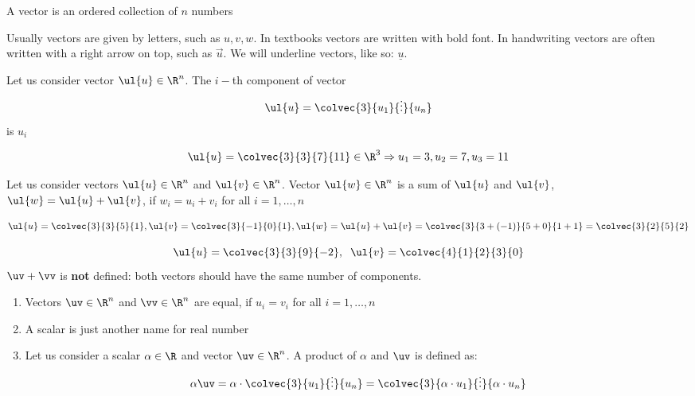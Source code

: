 \begin{definition}
	A vector is an ordered collection of $n$ numbers
\end{definition}

\begin{notation}
Usually vectors are given by letters, such as $u,v,w$. In textbooks vectors are written with bold font. In handwriting vectors are often written with a right arrow on top, such as $\overrightarrow{u}$. We will underline vectors, like so: $\underline{u}$.
\end{notation}

\begin{definition}
Let us consider vector $\ul{u}\in\R^n$. The $i-$th component of vector \[\ul{u}=\colvec{3}{u_1}{\vdots}{u_n}\] is $u_i$
\end{definition}

\begin{example}
\[\ul{u}=\colvec{3}{3}{7}{11}\in\R^3\Rightarrow u_1=3, u_2=7, u_3=11 \]
\end{example}

\begin{definition}
Let us consider vectors $\ul{u} \in\R^n$ and $\ul{v} \in\R^n$. Vector $\ul{w} \in\R^n$ is a sum of $\ul{u}$ and $\ul{v}$, $\ul{w}=\ul{u}+\ul{v}$, if $w_i=u_i+v_i$ for all $i=1,\dots,n$
\end{definition}

\begin{example}
\[\ul{u}=\colvec{3}{3}{5}{1}, \ul{v}=\colvec{3}{-1}{0}{1}, \ul{w}=\ul{u}+\ul{v}=\colvec{3}{3+(-1)}{5+0}{1+1}=\colvec{3}{2}{5}{2}\]
\end{example}

\begin{example}
\[\ul{u}=\colvec{3}{3}{9}{-2}, \hspace{2mm} \ul{v}=\colvec{4}{1}{2}{3}{0}\] $\uv+\vv$ is \textbf{not} defined: both vectors should have the same number of components.
\end{example}

\begin{definition}
\begin{enumerate}
	\item Vectors $\uv\in\R^n$ and $\vv\in\R^n$ are equal, if $u_i=v_i$ for all $i=1,\dots,n$
	\item A scalar is just another name for real number
	\item Let us consider a scalar $\alpha\in\R$ and vector $\uv \in\R^n$. A product of $\alpha$ and $\uv$ is defined as: \[\alpha\uv = \alpha\cdot\colvec{3}{u_1}{\vdots}{u_n} = \colvec{3}{\alpha\cdot u_1}{\vdots}{\alpha\cdot u_n}\]
\end{enumerate}
\end{definition}

